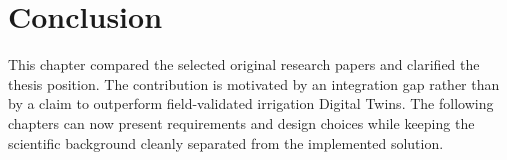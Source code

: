 \section{Conclusion}

This chapter compared the selected original research papers and clarified the thesis position. The contribution is motivated by an integration gap rather than by a claim to outperform field-validated irrigation Digital Twins. The following chapters can now present requirements and design choices while keeping the scientific background cleanly separated from the implemented solution.
